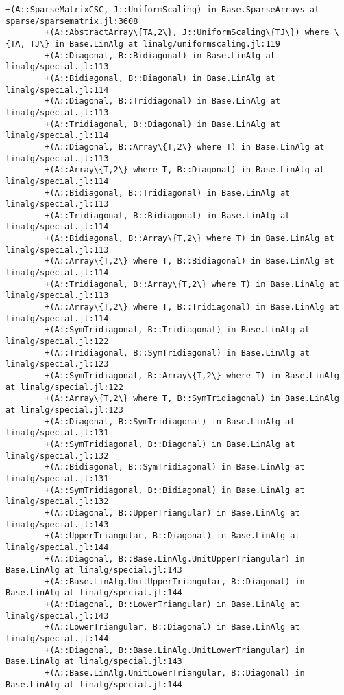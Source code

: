 \documentclass[11pt]{article}
\begin{document}
\begin{Verbatim}[commandchars=\\\{\}]
        +(A::SparseMatrixCSC, J::UniformScaling) in Base.SparseArrays at sparse/sparsematrix.jl:3608
        +(A::AbstractArray\{TA,2\}, J::UniformScaling\{TJ\}) where \{TA, TJ\} in Base.LinAlg at linalg/uniformscaling.jl:119
        +(A::Diagonal, B::Bidiagonal) in Base.LinAlg at linalg/special.jl:113
        +(A::Bidiagonal, B::Diagonal) in Base.LinAlg at linalg/special.jl:114
        +(A::Diagonal, B::Tridiagonal) in Base.LinAlg at linalg/special.jl:113
        +(A::Tridiagonal, B::Diagonal) in Base.LinAlg at linalg/special.jl:114
        +(A::Diagonal, B::Array\{T,2\} where T) in Base.LinAlg at linalg/special.jl:113
        +(A::Array\{T,2\} where T, B::Diagonal) in Base.LinAlg at linalg/special.jl:114
        +(A::Bidiagonal, B::Tridiagonal) in Base.LinAlg at linalg/special.jl:113
        +(A::Tridiagonal, B::Bidiagonal) in Base.LinAlg at linalg/special.jl:114
        +(A::Bidiagonal, B::Array\{T,2\} where T) in Base.LinAlg at linalg/special.jl:113
        +(A::Array\{T,2\} where T, B::Bidiagonal) in Base.LinAlg at linalg/special.jl:114
        +(A::Tridiagonal, B::Array\{T,2\} where T) in Base.LinAlg at linalg/special.jl:113
        +(A::Array\{T,2\} where T, B::Tridiagonal) in Base.LinAlg at linalg/special.jl:114
        +(A::SymTridiagonal, B::Tridiagonal) in Base.LinAlg at linalg/special.jl:122
        +(A::Tridiagonal, B::SymTridiagonal) in Base.LinAlg at linalg/special.jl:123
        +(A::SymTridiagonal, B::Array\{T,2\} where T) in Base.LinAlg at linalg/special.jl:122
        +(A::Array\{T,2\} where T, B::SymTridiagonal) in Base.LinAlg at linalg/special.jl:123
        +(A::Diagonal, B::SymTridiagonal) in Base.LinAlg at linalg/special.jl:131
        +(A::SymTridiagonal, B::Diagonal) in Base.LinAlg at linalg/special.jl:132
        +(A::Bidiagonal, B::SymTridiagonal) in Base.LinAlg at linalg/special.jl:131
        +(A::SymTridiagonal, B::Bidiagonal) in Base.LinAlg at linalg/special.jl:132
        +(A::Diagonal, B::UpperTriangular) in Base.LinAlg at linalg/special.jl:143
        +(A::UpperTriangular, B::Diagonal) in Base.LinAlg at linalg/special.jl:144
        +(A::Diagonal, B::Base.LinAlg.UnitUpperTriangular) in Base.LinAlg at linalg/special.jl:143
        +(A::Base.LinAlg.UnitUpperTriangular, B::Diagonal) in Base.LinAlg at linalg/special.jl:144
        +(A::Diagonal, B::LowerTriangular) in Base.LinAlg at linalg/special.jl:143
        +(A::LowerTriangular, B::Diagonal) in Base.LinAlg at linalg/special.jl:144
        +(A::Diagonal, B::Base.LinAlg.UnitLowerTriangular) in Base.LinAlg at linalg/special.jl:143
        +(A::Base.LinAlg.UnitLowerTriangular, B::Diagonal) in Base.LinAlg at linalg/special.jl:144

\end{Verbatim}
\end{document}
